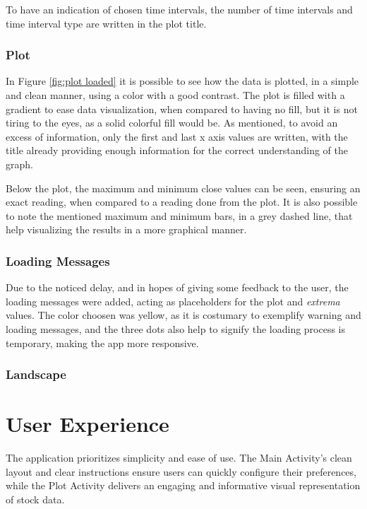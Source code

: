 \documentclass{article}
\begin{document}
To have an indication of chosen time intervals, the number of time intervals and time interval type are written in the plot title.

\subsubsection{Plot}
In Figure \ref{fig:plot loaded} it is possible to see how the data is plotted, in a simple and clean manner, using a color with a good contrast.
The plot is filled with a gradient to ease data visualization, when compared to having no fill, but it is not tiring to the eyes, as a solid colorful fill would be.
As mentioned, to avoid an excess of information, only the first and last x axis values are written, with the title already providing enough information for the correct understanding of the graph.

Below the plot, the maximum and minimum close values can be seen, ensuring an exact reading, when compared to a reading done from the plot.
It is also possible to note the mentioned maximum and minimum bars, in a grey dashed line, that help visualizing the results in a more graphical manner.


\subsubsection{Loading Messages}
Due to the noticed delay, and in hopes of giving some feedback to the user, the loading messages were added, acting as placeholders for the plot and \textit{extrema} values.
The color choosen was yellow, as it is costumary to exemplify warning and loading messages, and the three dots also help to signify the loading process is temporary, making the app more responsive.

\subsubsection{Landscape}


\section{User Experience}
The application prioritizes simplicity and ease of use. The Main Activity's clean layout and clear instructions ensure users can quickly configure their preferences, while the Plot Activity delivers an engaging and informative visual representation of stock data.




\end{document}
